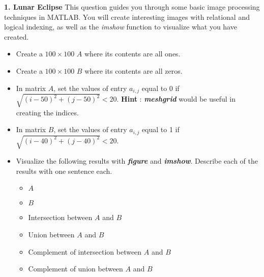 

\textbf{1. Lunar Eclipse} 
This question guides you through some basic image processing techniques in MATLAB.
You will create interesting images with relational and logical indexing,
as well as the \emph{imshow} function to visualize what you have created. 

\begin{itemize}
    \item Create a $100 \times 100$ $A$ where its contents are all ones.

    \item Create a $100 \times 100$ $B$ where its contents are all zeros.

    \item In matrix $A$, set the values of entry $a_{i,j}$ equal to 0 if $\sqrt{(i-50)^2 + (j-50)^2} < 20$.
    \textbf{Hint} : \textbf{\textit{meshgrid}} would be useful in creating the indices.

    \item In matrix $B$, set the values of entry $a_{i,j}$ equal to 1 if $\sqrt{(i-40)^2 + (j-40)^2} < 20$.

    \item Visualize the following results with \textbf{\textit{figure}} and \textbf{\textit{imshow}}. 
    Describe each of the results with one sentence each. 

        \begin{itemize}
        \item $A$
        \item $B$
        \item Intersection between $A$ and $B$
        \item Union between $A$ and $B$
        \item Complement of intersection between $A$ and $B$
        \item Complement of union between $A$ and $B$
        \end{itemize}
\end{itemize}